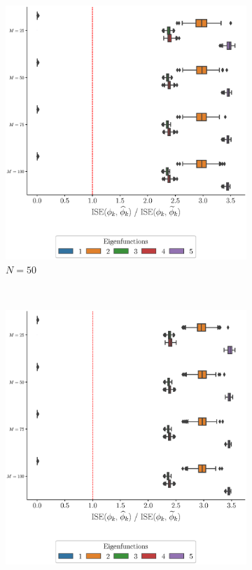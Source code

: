 \begin{results}
\begin{figure}
\begin{subfigure}[b]{0.49\textwidth}
         \includegraphics[width=\textwidth]{figures/scenario_2/ise_N50.eps}
         \caption{$N = 50$}
         \label{fig:ise_mfd_2d_50}
     \end{subfigure}
     \\
     \begin{subfigure}[b]{0.49\textwidth}
         \centering
         \includegraphics[width=\textwidth]{figures/scenario_2/ise_N75.eps}

\end{subfigure}
\end{figure}
\end{results}
